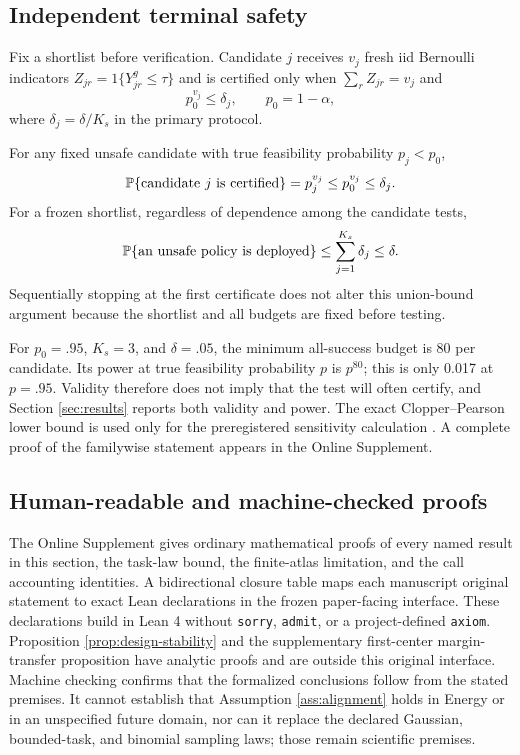 \subsection{Independent terminal safety}

Fix a shortlist before verification.  Candidate $j$ receives $v_j$ fresh iid
Bernoulli indicators $Z_{jr}=1\{Y^g_{jr}\le\tau\}$ and is certified only when
$\sum_rZ_{jr}=v_j$ and
\begin{equation}\label{eq:all-success-test}
 p_0^{v_j}\le\delta_j,
 \qquad p_0=1-\alpha,
\end{equation}
where $\delta_j=\delta/K_s$ in the primary protocol.

\begin{theorem}\label{thm:verifier}
For any fixed unsafe candidate with true feasibility probability $p_j<p_0$,
\[
 \mathbb{P}\{\text{candidate $j$ is certified}\}=p_j^{v_j}
 \le p_0^{v_j}\le\delta_j.
\]
For a frozen shortlist, regardless of dependence among the candidate tests,
\[
 \mathbb{P}\{\text{an unsafe policy is deployed}\}
 \le\sum_{j=1}^{K_s}\delta_j\le\delta.
\]
Sequentially stopping at the first certificate does not alter this union-bound
argument because the shortlist and all budgets are fixed before testing.
\end{theorem}

For $p_0=.95$, $K_s=3$, and $\delta=.05$, the minimum all-success budget is 80
per candidate.  Its power at true feasibility probability $p$ is $p^{80}$;
this is only 0.017 at $p=.95$.  Validity therefore does not imply that the
test will often certify, and Section \ref{sec:results} reports both validity
and power.  The exact Clopper--Pearson lower bound is used only for the
preregistered sensitivity calculation \citep{ClopperPearson1934}.  A complete
proof of the familywise statement appears in the Online Supplement.

\subsection{Human-readable and machine-checked proofs}

The Online Supplement gives ordinary mathematical proofs of every named result
in this section, the task-law bound, the finite-atlas limitation, and the call
accounting identities.  A bidirectional closure table maps each manuscript
original statement to exact Lean declarations in the frozen paper-facing interface.
These declarations build in Lean 4 without \texttt{sorry}, \texttt{admit}, or a
project-defined \texttt{axiom}.  Proposition \ref{prop:design-stability} and the supplementary
first-center margin-transfer proposition have analytic proofs and are
outside this original interface.  Machine checking confirms that the formalized
conclusions follow from the stated premises.  It cannot establish that
Assumption \ref{ass:alignment} holds in Energy or in an unspecified future
domain, nor can it replace the declared Gaussian, bounded-task, and binomial
sampling laws; those remain scientific premises.

